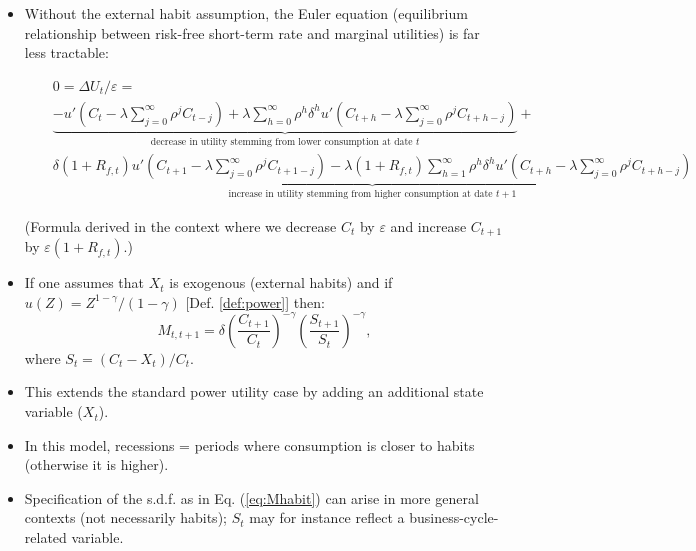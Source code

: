 \begin{frame}{}
\begin{footnotesize}
\begin{itemize}
	\item Without the external habit assumption, the Euler equation (equilibrium relationship between risk-free short-term rate and marginal utilities) is far less tractable:
\begin{tiny}
	\begin{eqnarray*}
	&& 0 = \Delta U_t / \varepsilon =\\
	&& \underbrace{ - u'\left(C_{t} - \lambda \sum_{j=0}^\infty \rho^j C_{t-j}\right) + \lambda  \sum_{h=0}^{\infty} \rho^h \delta^{h}u'\left(C_{t+h} - \lambda \sum_{j=0}^\infty \rho^j C_{t+h-j}\right)}_{\mbox{decrease in utility stemming from lower consumption at date $t$}} +\\
	&& \underbrace{\delta(1+R_{f,t}) u'\left(C_{t+1} - \lambda \sum_{j=0}^\infty \rho^j C_{t+1-j}\right) - \lambda (1+R_{f,t}) \sum_{h=1}^{\infty} \rho^h \delta^{h}u'\left(C_{t+h} - \lambda \sum_{j=0}^\infty \rho^j C_{t+h-j}\right)}_{\mbox{increase in utility stemming from higher consumption at date $t+1$}}
	\end{eqnarray*}
	
	(Formula derived in the context where we decrease $C_t$ by $\varepsilon$ and increase $C_{t+1}$ by $\varepsilon(1+R_{f,t})$.)
\end{tiny}
\end{itemize}
\end{footnotesize}
\end{frame}

\begin{frame}{}
\begin{footnotesize}
\begin{itemize}
	\item If one assumes that $X_t$ is exogenous (external habits) and if $u(Z)=Z^{1-\gamma}/(1-\gamma)$ [Def. \ref{def:power}] then:
	\begin{equation}\label{eq:Mhabit}
	M_{t,t+1} = \delta \left( \frac{C_{t+1}}{C_t} \right)^{-\gamma}\left( \frac{S_{t+1}}{S_t} \right)^{-\gamma},
	\end{equation}
	where $S_t = (C_t - X_t)/C_t$.
	\item This extends the standard power utility case by adding an additional state variable ($X_t$).
	\item In this model, recessions = periods where consumption is closer to habits (otherwise it is higher).
	\item Specification of the s.d.f. as in Eq. (\ref{eq:Mhabit}) can arise in more general contexts (not necessarily habits); $S_t$ may for instance reflect a business-cycle-related variable.
\end{itemize}
\end{footnotesize}
\end{frame}




